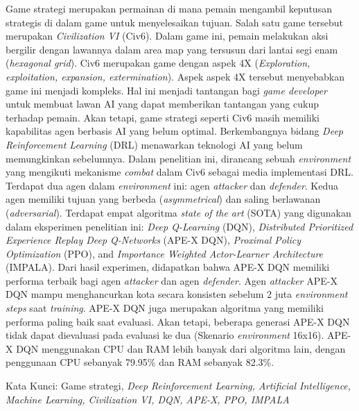 Game strategi merupakan permainan di mana pemain mengambil keputusan strategis di dalam game untuk menyelesaikan tujuan. 
Salah satu game tersebut merupakan \emph{Civilization VI} (Civ6).
Dalam game ini, pemain melakukan aksi bergilir dengan lawannya dalam area map yang tersusun dari lantai segi enam (\emph{hexagonal grid}).
Civ6 merupakan game dengan aspek 4X (\emph{Exploration, exploitation, expansion, extermination}). Aspek aspek 4X tersebut menyebabkan game ini menjadi kompleks.
Hal ini menjadi tantangan bagi \emph{game developer} untuk membuat lawan AI yang dapat memberikan tantangan yang cukup terhadap pemain. 
Akan tetapi, game strategi seperti Civ6 masih memiliki kapabilitas agen berbasis AI yang belum optimal.
Berkembangnya bidang \emph{Deep Reinforcement Learning} (DRL) menawarkan teknologi AI yang belum memungkinkan sebelumnya.
Dalam penelitian ini, dirancang sebuah \emph{environment} yang mengikuti mekanisme \emph{combat} dalam Civ6
sebagai media implementasi DRL. Terdapat dua agen dalam \emph{environment} ini: agen \emph{attacker} dan \emph{defender}.
Kedua agen memiliki tujuan yang berbeda (\emph{asymmetrical}) dan saling berlawanan (\emph{adversarial}).
Terdapat empat algoritma \emph{state of the art} (SOTA) yang digunakan dalam eksperimen penelitian ini:
\emph{Deep Q-Learning} (DQN), \emph{Distributed Prioritized Experience Replay Deep Q-Networks} (APE-X DQN),
\emph{Proximal Policy Optimization} (PPO), and \emph{Importance Weighted Actor-Learner Architecture} (IMPALA). Dari hasil experimen, didapatkan bahwa APE-X DQN memiliki performa terbaik bagi agen \emph{attacker}
dan agen \emph{defender}. Agen \emph{attacker} APE-X DQN mampu menghancurkan kota secara konsisten sebelum 2 juta \emph{environment steps} saat \emph{training}.
APE-X DQN juga merupakan algoritma yang memiliki performa paling baik saat evaluasi.
Akan tetapi, beberapa generasi APE-X DQN tidak dapat dievaluasi pada evaluasi ke dua (Skenario \emph{environment} 16x16).
APE-X DQN menggunakan CPU dan RAM lebih banyak dari algoritma lain, dengan penggunaan CPU sebanyak 79.95\% dan RAM sebanyak 82.3\%.

Kata Kunci: Game strategi, \emph{Deep Reinforcement Learning, Artificial Intelligence, Machine Learning, Civilization VI, DQN, APE-X, PPO, IMPALA}

